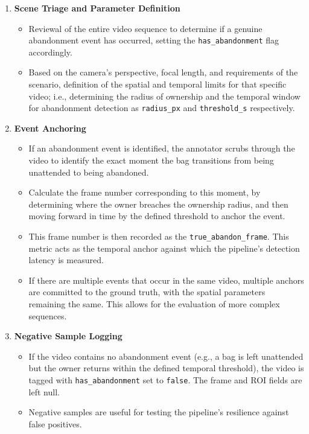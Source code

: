 \begin{enumerate}
	\item \textbf{Scene Triage and Parameter Definition}
	      \begin{itemize}
		      \item Reviewal of the entire video sequence to determine if a genuine abandonment
		            event has occurred, setting the \texttt{has\_abandonment} flag accordingly.
		      \item Based on the camera's perspective, focal length, and requirements of the
		            scenario, definition of the spatial and temporal limits for that specific
		            video; i.e., determining the radius of ownership and the temporal window for
		            abandonment detection as \texttt{radius\_px} and \texttt{threshold\_s}
		            respectively.
	      \end{itemize}
	\item \textbf{Event Anchoring}
	      \begin{itemize}
		      \item If an abandonment event is identified, the annotator scrubs through the video
		            to identify the exact moment the bag transitions from being unattended to being
		            abandoned.
		      \item Calculate the frame number corresponding to this moment, by determining where
		            the owner breaches the ownership radius, and then moving forward in time by the
		            defined threshold to anchor the event.
		      \item This frame number is then recorded as the \texttt{true\_abandon\_frame}. This
		            metric acts as the temporal anchor against which the pipeline's detection
		            latency is measured.
		      \item If there are multiple events that occur in the same video, multiple anchors are
		            committed to the ground truth, with the spatial parameters remaining the same.
		            This allows for the evaluation of more complex sequences.
	      \end{itemize}
	\item \textbf{Negative Sample Logging}
	      \begin{itemize}
		      \item If the video contains no abandonment event (e.g., a bag is left unattended but
		            the owner returns within the defined temporal threshold), the video is tagged
		            with \texttt{has\_abandonment} set to \texttt{false}. The frame and ROI fields
		            are left null.
		      \item Negative samples are useful for testing the pipeline's resilience against false
		            positives.
	      \end{itemize}
\end{enumerate}

